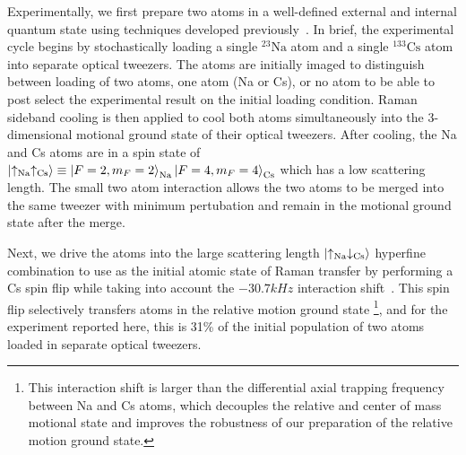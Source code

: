 \documentclass[aps,prl,twocolumn,superscriptaddress]{revtex4-1}
\begin{document}
Experimentally, we first prepare two atoms in a well-defined external and internal quantum state using techniques developed previously~\cite{Liu2018, Liu2019, Wang2019}. In brief, the experimental cycle begins by stochastically loading a single ${}^{23}\mathrm{Na}$ atom and a single ${}^{133}\mathrm{Cs}$ atom into separate optical tweezers. The atoms are initially imaged to distinguish between loading of two atoms, one atom (Na or Cs), or no atom to be able to post select the experimental result on the initial loading condition. Raman sideband cooling is then applied to cool both atoms simultaneously into the 3-dimensional motional ground state of their optical tweezers. After cooling, the Na and Cs atoms are in a spin state of $\ket{\uparrow_{\text{Na}}\uparrow_{\text{Cs}}}\equiv \ket{F=2,m_F=2}_{\text{Na}}\ket{F=4,m_F=4}_{\text{Cs}} $ %
which has a low scattering length. The small two atom interaction allows the two atoms to be merged into the same tweezer with minimum pertubation and remain in the motional ground state after the merge.

Next, we  drive the atoms into the large scattering length $\ket{\uparrow_{\text{Na}} \downarrow_{\text{Cs}}}$ hyperfine combination to use as the initial atomic state of Raman transfer by performing a Cs spin flip while taking into account the $-30.7 kHz$ interaction shift~\cite{Hood2019}.  %
This spin flip selectively transfers atoms in the relative motion ground state \footnote{This interaction shift is larger than the differential axial trapping frequency between Na and Cs atoms, which decouples the relative and center of mass motional state and improves the robustness of our preparation of the relative motion ground state.}, and for the experiment reported here, this is 31\% of the initial population of two atoms loaded in separate optical tweezers.
\end{document}

